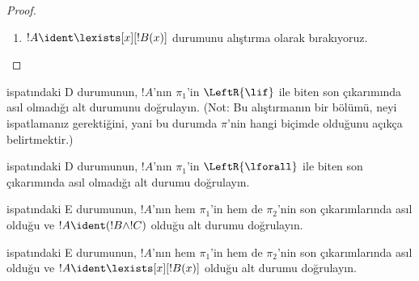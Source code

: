\documentclass[../../../include/open-logic-section]{subfiles}
\begin{document}
\begin{proof}
\begin{enumerate}
!!{proof}~$\pi_1'$nün son-sekantı
$\Gamma \Sequent \Delta, !B(c)$'dir; burada $c$, bir
$\RightR{\lforall}$ çıkarımının özdeğişkenidir. Dolayısıyla $c$,
$!B(x)$, $\Gamma$ ya da~$\Delta$ içinde geçmez. !!{proof}~$\pi$'nin
düzenli olduğunu varsayarız; öyleyse $c$, yalnızca aşağıdaki
$\RightR{\lforall}$ çıkarımının özdeğişkenidir ve yalnızca onun üstünde,
yani yalnızca~$\pi_1'$ içinde geçer; ayrıca $\pi_1'$ içindeki bir
çıkarımın özdeğişkeni değildir. $c$, $\pi_2$ içinde geçmediği için
$t$ içinde de geçemez.  uyarınca
!!{proof}~$\Subst{\pi_1'}{t}{c}$,
$\Gamma \Sequent \Delta, !B(t)$'nin !!a{proof}{}ıdır. Şimdi tümevarım
varsayımını şu !!{proof}{}a uygularız:
\[
\AxiomC{}
\RightLabel{$\Subst{\pi_1'}{t}{c}$}
\Deduce$\Gamma \fCenter \Delta, !B(t)$
\AxiomC{}
\RightLabel{$\pi_2''$}
\Deduce$!B(t), \Gamma \fCenter \Delta$
\RightLabel{\CutCS}
\BinaryInf$\Gamma \fCenter \Delta$
\DisplayProof
\]
(Kesme !!{formula}{}ü~$!B(t)$ olduğu için tümevarım varsayımı uygulanır;
yani !!{proof}{}ın kesme derecesi~$\pi$'ninkinden düşüktür.)
\item $!A \ident \lexists[x][!B(x)]$ durumunu alıştırma olarak
bırakıyoruz.
\end{enumerate}
\end{proof}

\begin{prob}
 ispatındaki D durumunun, $!A$'nın
$\pi_1$'in $\LeftR{\lif}$ ile biten son çıkarımında asıl olmadığı alt
durumunu doğrulayın. (Not: Bu alıştırmanın bir bölümü, neyi
ispatlamanız gerektiğini, yani bu durumda $\pi$'nin hangi biçimde
olduğunu açıkça belirtmektir.)
\end{prob}

\begin{prob}
 ispatındaki D durumunun, $!A$'nın
$\pi_1$'in $\LeftR{\lforall}$ ile biten son çıkarımında asıl olmadığı
alt durumu doğrulayın.
\end{prob}

\begin{prob}
 ispatındaki E durumunun, $!A$'nın hem
$\pi_1$'in hem de $\pi_2$'nin son çıkarımlarında asıl olduğu ve
$!A \ident (!B \land !C)$ olduğu alt durumu doğrulayın.
\end{prob}

\begin{prob}
 ispatındaki E durumunun, $!A$'nın hem
$\pi_1$'in hem de $\pi_2$'nin son çıkarımlarında asıl olduğu ve
$!A \ident \lexists[x][!B(x)]$ olduğu alt durumu doğrulayın.
\end{prob}
\end{document}
